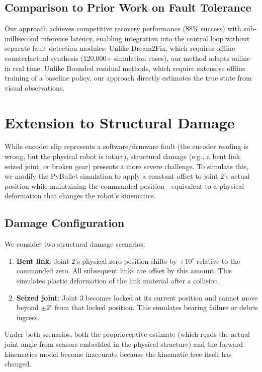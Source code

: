 \documentclass[12pt,a4paper,oneside]{report}
\begin{document}
\subsection{Comparison to Prior Work on Fault Tolerance}

Our approach achieves competitive recovery performance (88\% success) with sub-millisecond inference latency, enabling integration into the control loop without separate fault detection modules. Unlike Dream2Fix, which requires offline counterfactual synthesis (120,000+ simulation cases), our method adapts online in real time. Unlike Bounded residual methods, which require extensive offline training of a baseline policy, our approach directly estimates the true state from visual observations.

\section{Extension to Structural Damage}

While encoder slip represents a software/firmware fault (the encoder reading is wrong, but the physical robot is intact), structural damage (e.g., a bent link, seized joint, or broken gear) presents a more severe challenge. To simulate this, we modify the PyBullet simulation to apply a constant offset to joint 2's actual position while maintaining the commanded position---equivalent to a physical deformation that changes the robot's kinematics.

\subsection{Damage Configuration}

We consider two structural damage scenarios:
\begin{enumerate}
    \item \textbf{Bent link}: Joint 2's physical zero position shifts by $+10^\circ$ relative to the commanded zero. All subsequent links are offset by this amount. This simulates plastic deformation of the link material after a collision.
    \item \textbf{Seized joint}: Joint 3 becomes locked at its current position and cannot move beyond $\pm2^\circ$ from that locked position. This simulates bearing failure or debris ingress.
\end{enumerate}
Under both scenarios, both the proprioceptive estimate (which reads the actual joint angle from sensors embedded in the physical structure) and the forward kinematics model become inaccurate because the kinematic tree itself has changed.
\end{document}
